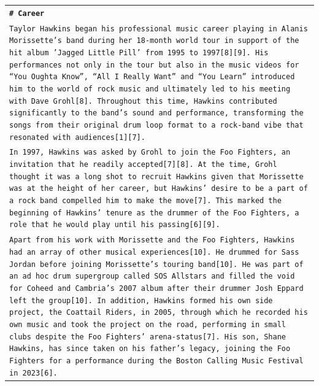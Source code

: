\begin{longtable}{p{\textwidth}}
\vspace{1pt}
\texttt{\small{\textbf{\# Career}}} \\
\texttt{\small{Taylor Hawkins began his professional music career playing in Alanis Morissette’s band during her 18-month world tour in support of the hit album 'Jagged Little Pill' from 1995 to 1997[8][9]. His performances not only in the tour but also in the music videos for “You Oughta Know”, “All I Really Want” and “You Learn” introduced him to the world of rock music and ultimately led to his meeting with Dave Grohl[8]. Throughout this time, Hawkins contributed significantly to the band's sound and performance, transforming the songs from their original drum loop format to a rock-band vibe that resonated with audiences[1][7].}} \\
\texttt{\small{In 1997, Hawkins was asked by Grohl to join the Foo Fighters, an invitation that he readily accepted[7][8]. At the time, Grohl thought it was a long shot to recruit Hawkins given that Morissette was at the height of her career, but Hawkins' desire to be a part of a rock band compelled him to make the move[7]. This marked the beginning of Hawkins' tenure as the drummer of the Foo Fighters, a role that he would play until his passing[6][9].}} \\
\texttt{\small{Apart from his work with Morissette and the Foo Fighters, Hawkins had an array of other musical experiences[10]. He drummed for Sass Jordan before joining Morissette’s touring band[10]. He was part of an ad hoc drum supergroup called SOS Allstars and filled the void for Coheed and Cambria’s 2007 album after their drummer Josh Eppard left the group[10]. In addition, Hawkins formed his own side project, the Coattail Riders, in 2005, through which he recorded his own music and took the project on the road, performing in small clubs despite the Foo Fighters' arena-status[7]. His son, Shane Hawkins, has since taken on his father's legacy, joining the Foo Fighters for a performance during the Boston Calling Music Festival in 2023[6].}}\\


\end{longtable}
